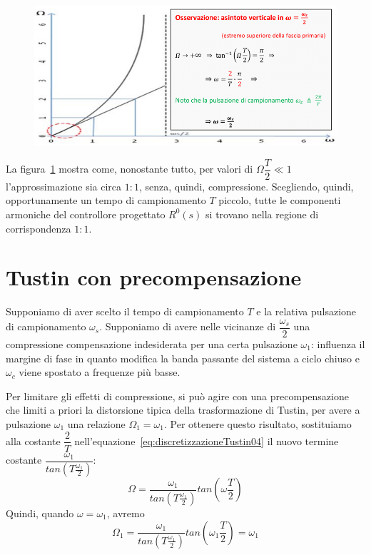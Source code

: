 \documentclass[a4paper]{report}
\begin{document}
\begin{figure}[!h]
  \begin{center}
    \includegraphics[scale=0.3]{./figures/discretizzazioneTustin04.png}
    \caption{}\label{fig:discretizzazioneTustin04}
  \end{center}
\end{figure}
La figura~\ref{fig:discretizzazioneTustin04} mostra come, nonostante
tutto, per valori di $\Omega \dfrac{T}{2} \ll 1$ l'approssimazione sia
circa $1:1$, senza, quindi, compressione. Scegliendo, quindi,
opportunamente un tempo di campionamento $T$ piccolo, tutte le
componenti armoniche del controllore progettato $R^{0}(s)$ si trovano
nella regione di corrispondenza $1:1$.

\section{Tustin con precompensazione}
Supponiamo di aver scelto il tempo di campionamento $T$ e la relativa
pulsazione di campionamento $\omega_s$. Supponiamo di avere nelle
vicinanze di $\dfrac{\omega_s}{2}$ una compressione compensazione
indesiderata per una certa pulsazione $\omega_1$: influenza il margine
di fase in quanto modifica la banda passante del sistema a ciclo
chiuso e $\omega_c$ viene spostato a frequenze pi\`u basse.

Per limitare gli effetti di compressione, si pu\`o agire con una
precompensazione che limiti a priori la distorsione tipica della
trasformazione di Tustin, per avere a pulsazione $\omega_1$ una
relazione $\Omega_1 = \omega_1$. Per ottenere questo risultato,
sostituiamo alla costante $\dfrac{2}{T}$
nell'equazione~\ref{eq:discretizzazioneTustin04} il nuovo termine
costante $\dfrac{\omega_1}{tan\left( T\frac{\omega_1}{2}\right)}$:
\[
\Omega = \dfrac{\omega_1}{tan\left( T\frac{\omega_1}{2}\right)} tan
\left( \omega \frac{T}{2}\right)
\]
Quindi, quando $\omega = \omega_1$, avremo
\[
\Omega_1 = \dfrac{\omega_1}{tan\left( T\frac{\omega_1}{2}\right)} tan
\left( \omega_1 \frac{T}{2}\right) = \omega_1
\]
\end{document}
